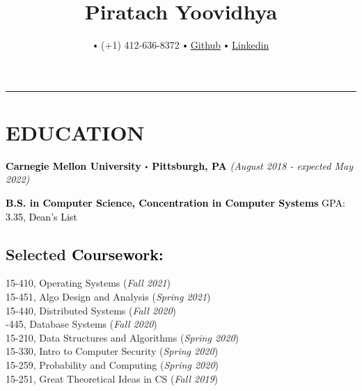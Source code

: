 \documentclass[10pt]{article}
\title{\bfseries\Huge Piratach Yoovidhya}
\author{
  \small \myemail
   $\sbullet[.75]$
   (+1) 412-636-8372
   $\sbullet[.75]$
  \href{https://github.com/Piratach}{Github}
   $\sbullet[.75]$
  \href{https://www.linkedin.com/in/piratach-yoovidhya/}
{Linkedin}
}
\date{}
\newcommand\sbullet[1][.5]{\mathbin{\vcenter{\hbox{\scalebox{#1}{$\bullet$}}}}}
\begin{document}
  \maketitle
  \thispagestyle{empty}
  \vspace*{-1.0cm}
  \hrule
  \vspace*{-0.15cm}

  \section*{\large \textcolor{lighterB}{EDUCATION}}
  \vspace*{-0.3cm}
  \textbf{\large \textcolor{Black}{Carnegie Mellon University $\sbullet$ Pittsburgh, PA}} \hfill \textit{(August 2018 - expected May 2022)}

  \vspace{0.05cm}

  \textcolor{Black}{\textbf{B.S. in Computer Science, Concentration in Computer Systems} \hfill GPA: 3.35, Dean's List}

  \vspace{0.2cm}

  \vspace*{-0.5cm}

  \subsection*{Selected \textcolor{Black}{Coursework:}}

    \vspace*{-0.55cm}
    \begin{multicols}{2}
       15-410, Operating Systems (\textit{Fall 2021}) \\
       15-451, Algo Design and Analysis (\textit{Spring 2021}) \\
       15-440, Distributed Systems (\textit{Fall 2020}) \\
       -445, Database Systems (\textit{Fall 2020}) \\
       15-210, Data Structures and Algorithms (\textit{Spring 2020}) \\
       15-330, Intro to Computer Security (\textit{Spring 2020}) \\
       15-259, Probability and Computing (\textit{Spring 2020}) \\
       15-251, Great Theoretical Ideas in CS (\textit{Fall 2019})
    \end{multicols}
\end{document}
